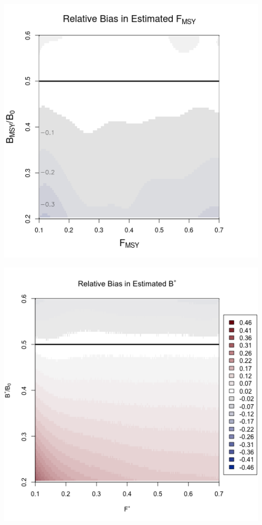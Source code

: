\documentclass[ xcolor = pdftex, dvipsnames, table ]{beamer}
\begin{document}
\begin{frame}
{\begin{minipage}[h!]{0.325\textwidth}
\hspace*{-0.25cm}
\includegraphics[width=1.1\textwidth]{../../.././nick/gpBias/fMSYRelBiasPellaExpT90.png}
\end{minipage}
\begin{minipage}[h!]{0.325\textwidth}
\hspace*{0.25cm}
\includegraphics[width=1.1\textwidth]{../../.././nick/gpBias/bMSYRelBiasPellaExpT45.png}\\

\end{minipage}}
\end{frame}
\end{document}

